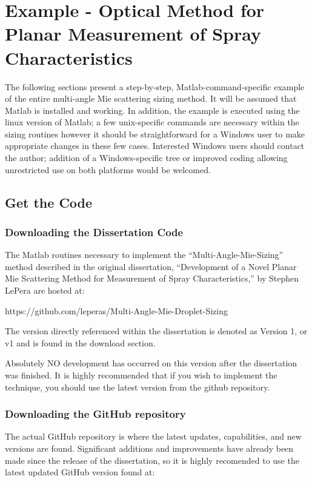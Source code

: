 \chapter{Example - Optical Method for Planar Measurement of Spray Characteristics}
\label{step_by_step_example}

The following sections present a step-by-step, Matlab-command-specific example of the entire multi-angle Mie scattering sizing method.  It will be assumed that Matlab is installed and working.  In addition, the example is executed using the linux version of Matlab; a few unix-specific commands are necessary within the sizing routines however it should be straightforward for a Windows user to make appropriate changes in these few cases.  Interested Windows users should contact the author; addition of a Windows-specific tree or improved coding allowing unrestricted use on both platforms would be welcomed.

\section{Get the Code}
\subsection{Downloading the Dissertation Code}
The Matlab routines necessary to implement the ``Multi-Angle-Mie-Sizing'' method described in the original dissertation, ``Development of a Novel Planar Mie Scattering Method for Measurement of Spray Characteristics,'' by Stephen LePera are hosted at:

https://github.com/leperas/Multi-Angle-Mie-Droplet-Sizing

The version directly referenced within the dissertation is denoted as Version 1, or v1 and is found in the download section.

Absolutely NO development has occurred on this version after the dissertation was finished.  It is highly recommended that if you wish to implement the technique, you should use the latest version from the github repository.

\subsection{Downloading the GitHub repository}

The actual GitHub repository is where the latest updates, capabilities, and new versions are found.  Significant additions and improvements have already been made since the release of the dissertation, so it is highly recomended to use the latest updated GitHub version found at:

